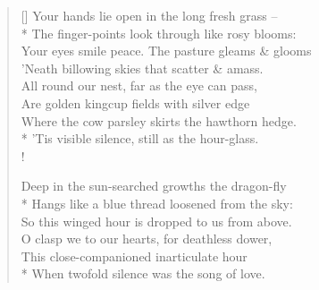 \documentclass[MAIN]{subfiles}
\begin{document}
\settowidth{\versewidth}{Your eyes smile peace. The pasture gleams \& glooms}
\begin{verse}[\versewidth]
Your hands lie open in the long fresh grass --\\*
\vin The finger-points look through like rosy blooms:\\
\vin Your eyes smile peace. The pasture gleams \& glooms\\
'Neath billowing skies that scatter \& amass.\\
All round our nest, far as the eye can pass,\\
\vin Are golden kingcup fields with silver edge\\
\vin Where the cow parsley skirts the hawthorn hedge.\\*
'Tis visible silence, still as the hour-glass.\\!

Deep in the sun-searched growths the dragon-fly\\*
Hangs like a blue thread loosened from the sky:\\
\vin So this winged hour is dropped to us from above.\\
\vin \vin O clasp we to our hearts, for deathless dower,\\
\vin \vin This close-companioned inarticulate hour\\*
\vin When twofold silence was the song of love.
\end{verse}
\end{document}
